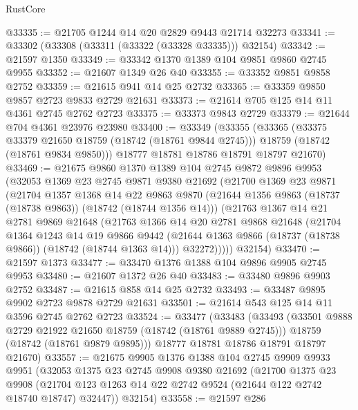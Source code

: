 \begin{lexlean}{RustCore}
\begin{coremodule}
@33335 := @21705 @1244 @14 @20 @2829 @9443 @21714 @32273
@33341 := @33302 (@33308 (@33311 (@33322 (@33328 @33335))) @32154)
@33342 := @21597 @1350
@33349 := @33342 @1370 @1389 @104 @9851 @9860 @2745 @9955
@33352 := @21607 @1349 @26 @40
@33355 := @33352 @9851 @9858 @2752
@33359 := @21615 @941 @14 @25 @2732
@33365 := @33359 @9850 @9857 @2723 @9833 @2729 @21631
@33373 := @21614 @705 @125 @14 @11 @4361 @2745 @2762 @2723
@33375 := @33373 @9843 @2729
@33379 := @21644 @704 @4361 @23976 @23980
@33400 := @33349
    (@33355
      (@33365
        (@33375 @33379 @21650 @18759 (@18742 (@18761 @9844 @2745)))
        @18759
        (@18742 (@18761 @9834 @9850)))
      @18777
      @18781
      @18786
      @18791
      @18797
      @21670)
@33469 := @21675
    @9860
    @1370
    @1389
    @104
    @2745
    @9872
    @9896
    @9953
    (@32053
      @1369
      @23
      @2745
      @9871
      @9380
      @21692
      (@21700
        @1369
        @23
        @9871
        (@21704
          @1357
          @1368
          @14
          @22
          @9863
          @9870
          (@21644 @1356 @9863 (@18737 (@18738 @9863)) (@18742 (@18744 @1356 @14)))
          (@21763
            @1367
            @14
            @21
            @2781
            @9869
            @21648
            (@21763
              @1366
              @14
              @20
              @2781
              @9868
              @21648
              (@21704
                @1364
                @1243
                @14
                @19
                @9866
                @9442
                (@21644 @1363 @9866 (@18737 (@18738 @9866)) (@18742 (@18744 @1363 @14)))
                @32272)))))
      @32154)
@33470 := @21597 @1373
@33477 := @33470 @1376 @1388 @104 @9896 @9905 @2745 @9953
@33480 := @21607 @1372 @26 @40
@33483 := @33480 @9896 @9903 @2752
@33487 := @21615 @858 @14 @25 @2732
@33493 := @33487 @9895 @9902 @2723 @9878 @2729 @21631
@33501 := @21614 @543 @125 @14 @11 @3596 @2745 @2762 @2723
@33524 := @33477
    (@33483
      (@33493
        (@33501 @9888 @2729 @21922 @21650 @18759 (@18742 (@18761 @9889 @2745)))
        @18759
        (@18742 (@18761 @9879 @9895)))
      @18777
      @18781
      @18786
      @18791
      @18797
      @21670)
@33557 := @21675
    @9905
    @1376
    @1388
    @104
    @2745
    @9909
    @9933
    @9951
    (@32053
      @1375
      @23
      @2745
      @9908
      @9380
      @21692
      (@21700
        @1375
        @23
        @9908
        (@21704 @123 @1263 @14 @22 @2742 @9524 (@21644 @122 @2742 @18740 @18747) @32447))
      @32154)
@33558 := @21597 @286

\end{coremodule}
\end{lexlean}

